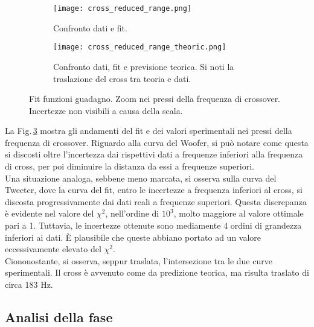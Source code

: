 \documentclass[../Relazione_circuiti]{subfiles}
\begin{document}
  \begin{figure}[H]
    \centering

    \begin{subfigure}[t]{=0.49\textwidth}
      \texttt{[image: cross\_reduced\_range.png]}
      \caption{Confronto dati e fit.}
      \label{fig: amp_gain_fit_data_reduced}

    \end{subfigure}
    \hfill
    \begin{subfigure}[t]{=0.49\textwidth}
      \texttt{[image: cross\_reduced\_range\_theoric.png]}
      \caption{Confronto dati, fit e previsione teorica. Si noti la traslazione del cross tra teoria e dati.}
      \label{fig: amp_gain_fit_theoric_reduced}
    \end{subfigure}

    \caption
    {Fit funzioni guadagno. Zoom nei pressi della frequenza di crossover. Incertezze non visibili a causa della scala.}
    \label{fig: amp_gain_fit_reduced}


  \end{figure}

  La Fig.\,\ref{fig: amp_gain_fit_reduced}
  mostra gli andamenti del fit e dei valori sperimentali nei pressi della frequenza di crossover.
  Riguardo alla curva del Woofer, si può notare come questa si discosti oltre l'incertezza dai rispettivi dati a
  frequenze inferiori alla frequenza di cross, per poi diminuire la distanza da essi a frequenze superiori. \\
  Una situazione analoga, sebbene meno marcata, si osserva sulla curva del Tweeter, dove la curva del fit, entro le
  incertezze a frequenza inferiori al cross, si discosta progressivamente dai dati reali a frequenze superiori.
  Questa discrepanza è evidente nel valore del $\chi^2$, nell'ordine di $10^3$, molto maggiore al valore ottimale pari a 1.
  Tuttavia, le incertezze ottenute sono mediamente 4 ordini di grandezza inferiori ai dati.
  È plausibile che queste  abbiano portato ad un valore eccessivamente elevato del $\chi^2$. \\
  Ciononostante, si osserva, seppur traslata, l'intersezione tra le due curve sperimentali.
  Il cross è avvenuto come da  predizione teorica, ma risulta traslato di circa 183 Hz.

\subsection{Analisi della fase}
\end{document}
